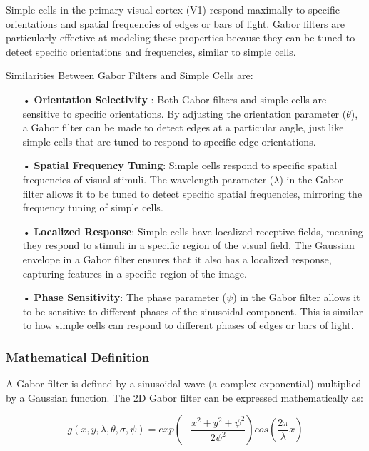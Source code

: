 \documentclass[12pt]{article}
\begin{document}
Simple cells in the primary visual cortex (V1) respond maximally to specific orientations and spatial frequencies of edges or bars of light. Gabor filters are particularly effective at modeling these properties because they can be tuned to detect specific orientations and frequencies, similar to simple cells.


Similarities Between Gabor Filters and Simple Cells are:

\begin{itemize}
\item[•] \textbf{Orientation Selectivity} :  Both Gabor filters and simple cells are sensitive to specific orientations. By adjusting the orientation parameter ($\theta$), a Gabor filter can be made to detect edges at a particular angle, just like simple cells that are tuned to respond to specific edge orientations.

\item[•] \textbf{Spatial Frequency Tuning}: Simple cells respond to specific spatial frequencies of visual stimuli. The wavelength parameter ($\lambda$) in the Gabor filter allows it to be tuned to detect specific spatial frequencies, mirroring the frequency tuning of simple cells.

\item[•] \textbf{Localized Response}: Simple cells have localized receptive fields, meaning they respond to stimuli in a specific region of the visual field. The Gaussian envelope in a Gabor filter ensures that it also has a localized response, capturing features in a specific region of the image.

\item[•] \textbf{Phase Sensitivity}: The phase parameter ($\psi$) in the Gabor filter allows it to be sensitive to different phases of the sinusoidal component. This is similar to how simple cells can respond to different phases of edges or bars of light.

\end{itemize}

\subsubsection{Mathematical Definition}

	A Gabor filter is defined by a sinusoidal wave (a complex exponential) multiplied by a Gaussian function. The 2D Gabor filter can be expressed mathematically as:
	
	$$ g(x, y, \lambda, \theta, \sigma, \psi) = exp(- \frac{x^2+y^2+\psi^2}{2\psi^2}) cos(\frac{2\pi}{\lambda}x) $$
	
\end{document}

